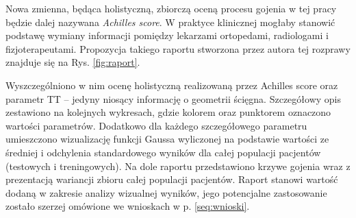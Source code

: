 Nowa zmienna, będąca holistyczną, zbiorczą oceną procesu gojenia w tej pracy będzie dalej nazywana \textit{Achilles score}. W praktyce klinicznej mogłaby stanowić podstawę wymiany informacji pomiędzy lekarzami ortopedami, radiologami i fizjoterapeutami. Propozycja takiego raportu stworzona przez autora tej rozprawy znajduje się na Rys. \ref{fig:raport}. 

Wyszczególniono w nim ocenę holistyczną realizowaną przez Achilles score oraz parametr TT -- jedyny niosący informację o geometrii ścięgna. Szczegółowy opis zestawiono na kolejnych wykresach, gdzie kolorem oraz punktorem oznaczono wartości parametrów. Dodatkowo dla każdego szczegółowego parametru umieszczono wizualizację funkcji Gaussa wyliczonej na podstawie wartości ze średniej i odchylenia standardowego wyników dla całej populacji pacjentów (testowych i treningowych). Na dole raportu przedstawiono krzywe gojenia wraz z prezentacją wariancji zbioru całej populacji pacjentów. Raport stanowi wartość dodaną w zakresie analizy wizualnej wyników, jego potencjalne zastosowanie zostało szerzej omówione we wnioskach w p. \ref{seq:wnioski}. 

